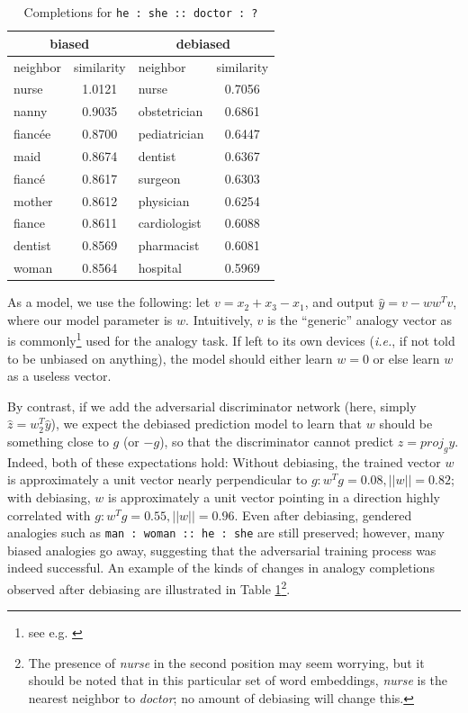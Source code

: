 \documentclass[letterpaper]{article} %
\newcommand{\notem}[1]{\textcolor{blue}{\it [#1 --M]}}
\newcommand{\notebz}[1]{\textcolor{purple}{\it [#1 --BZ]}}
\newcommand{\incite}[1]{\citeauthor{#1} \shortcite{#1}}
\theoremstyle{definition}
\begin{document}
\begin{table}
\begin{center}
  \begin{tabular}{| l | c | l | c |}
    \hline
    \multicolumn{2}{|c|}{biased} & \multicolumn{2}{c|}{debiased} \\ \hline
    neighbor & similarity & neighbor & similarity \\
    \hline \hline
    nurse & 1.0121 & nurse & 0.7056 \\ \hline
    nanny & 0.9035 & obstetrician & 0.6861 \\ \hline
    fianc\'{e}e & 0.8700 & pediatrician & 0.6447 \\ \hline
    maid & 0.8674 & dentist & 0.6367 \\ \hline
    fianc\'{e} & 0.8617 & surgeon & 0.6303 \\ \hline
    mother & 0.8612 & physician & 0.6254 \\ \hline
    fiance & 0.8611 & cardiologist & 0.6088 \\ \hline
    dentist & 0.8569 & pharmacist & 0.6081 \\ \hline
    woman & 0.8564 & hospital & 0.5969 \\ \hline
  \end{tabular}
  \caption{Completions for \texttt{\small he : she :: doctor : ?}}
  \label{table:heshedoctor}
\end{center}
\end{table}

As a model, we use the following: let $v=x_{2}+x_{3}-x_{1}$, and output $\hat{y}=v-ww^{T}v$, where our model parameter is $w$. Intuitively, $v$ is the ``generic'' analogy vector as is commonly\footnote{see e.g. \incite{mikolov2013distributed}} %
used for the analogy task. If left to its own devices ({\it i.e.}, if not told to be unbiased on anything), the model should either learn $w=0$ or else learn $w$ as a useless vector. 

By contrast, if we add the adversarial discriminator network (here, simply $\hat{z}=w_{2}^{T}\hat{y}$), we expect the debiased prediction model to learn that $w$ should be something close to $g$ (or $-g$), so that the discriminator cannot predict $z=proj_{g}y$. Indeed, both of these expectations hold: Without debiasing, the trained vector $w$ is approximately a unit vector nearly perpendicular to $g: w^{T}g=0.08,||w||=0.82$; with debiasing, $w$ is approximately a unit vector pointing in a direction highly correlated with $g: w^{T}g=0.55,||w||=0.96$. Even after debiasing, gendered analogies such as \texttt{man : woman :: he : she} are still preserved; however, many biased analogies go away, suggesting that the adversarial training process was indeed successful. An example of the kinds of changes in analogy completions observed after debiasing are illustrated in Table \ref{table:heshedoctor}\footnote{The presence of {\it nurse} in the second position may seem worrying, but it should be noted that in this particular set of word embeddings, {\it nurse} is the nearest neighbor to {\it doctor}; no amount of debiasing will change this.}.
\end{document}
